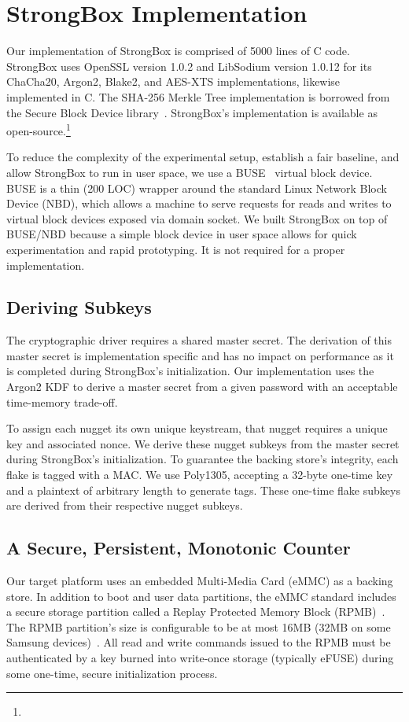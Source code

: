 \section{StrongBox Implementation}\label{sec:implementation}

Our implementation of StrongBox is comprised of 5000 lines of C code. StrongBox
uses OpenSSL version 1.0.2 and LibSodium version 1.0.12 for its ChaCha20,
Argon2, Blake2, and AES-XTS implementations, likewise implemented in C. The
SHA-256 Merkle Tree implementation is borrowed from the Secure Block Device
library~\cite{SBD}. StrongBox's implementation is available as
open-source.\footnote{\StrongBoxURI}

To reduce the complexity of the experimental setup, establish a fair baseline,
and allow StrongBox to run in user space, we use a BUSE~\cite{BUSE} virtual
block device. BUSE is a thin (200 LOC) wrapper around the standard Linux Network
Block Device (NBD), which allows a machine to serve requests for reads and
writes to virtual block devices exposed via domain socket. We built StrongBox on
top of BUSE/NBD because a simple block device in user space allows for quick
experimentation and rapid prototyping. It is not required for a proper
implementation.

\subsection{Deriving Subkeys}
The cryptographic driver requires a shared master secret. The
derivation of this master secret is implementation specific and has no
impact on performance as it is completed during StrongBox's
initialization. Our implementation uses the Argon2 KDF to derive a
master secret from a given password with an acceptable time-memory
trade-off.

To assign each nugget its own unique keystream, that nugget requires a
unique key and associated nonce. We derive these nugget subkeys from
the master secret during StrongBox's initialization. To guarantee the
backing store's integrity, each flake is tagged with a MAC. We use
Poly1305, accepting a 32-byte one-time key and a plaintext of
arbitrary length to generate tags. These one-time flake subkeys are
derived from their respective nugget subkeys.

\subsection{A Secure, Persistent, Monotonic Counter} 
Our target platform uses an embedded Multi-Media Card (eMMC) as a
backing store. In addition to boot and user data partitions, the eMMC
standard includes a secure storage partition called a Replay Protected
Memory Block (RPMB)~\cite{eMMC-standard}. The RPMB partition's size
is configurable to be at most 16MB (32MB on some Samsung
devices)~\cite{RPMB}. All read and write commands issued to the RPMB
must be authenticated by a key burned into write-once storage
(typically eFUSE) during some one-time, secure initialization process.

